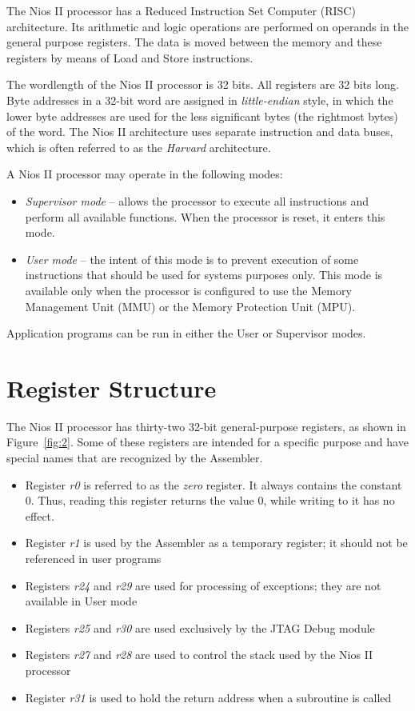 \documentclass[11pt, twoside, pdftex]{article}
\begin{document}
The Nios II processor has a Reduced Instruction Set Computer (RISC) architecture.
Its arithmetic and logic operations are performed on operands in the general
purpose registers. The data is moved between the memory and these registers by
means of Load and Store instructions.

The wordlength of the Nios II processor is 32 bits. All registers are 32 bits long.
Byte addresses in a 32-bit word are assigned in {\it little-endian} style, 
in which the lower byte addresses are used for the
less significant bytes (the rightmost bytes) of the word. The Nios II architecture uses separate instruction and data buses, which is
often referred to as the {\it Harvard} architecture. 

A Nios II processor may operate in the following modes:
\begin{itemize}
\item {\it Supervisor mode} -- allows the processor to execute all instructions
and perform all available functions. When the processor is reset, it enters this mode.
\item {\it User mode} -- the intent of this mode is to prevent execution of some 
instructions that should be used for systems purposes only. This mode is available only
when the processor is configured  to use the Memory Management Unit (MMU) or the
Memory Protection Unit (MPU).
\end{itemize}
\noindent Application programs can be run in either the User or Supervisor modes.

\section{Register Structure}
The Nios II processor has thirty-two 32-bit general-purpose registers, 
as shown in Figure~\ref{fig:2}. Some of these registers are intended for a specific purpose
and have special names that are recognized by the Assembler.
\begin{itemize}
\item Register {\it r0} is referred to as the {\it zero} register. 
It always contains the constant 0.
Thus, reading this register returns the value 0, while writing to it has no effect.
\item Register {\it r1} is used by the Assembler as a temporary register; it should
not be referenced in user programs
\item Registers {\it r24} and {\it r29} are used for processing of exceptions;
they are not available in User mode
\item Registers {\it r25} and {\it r30} are used exclusively by the JTAG Debug module
\item Registers {\it r27} and {\it r28} are used to control the stack used by
the Nios II processor
\item Register {\it r31} is used to hold the return address when a subroutine is called
\end{itemize}
\end{document}
